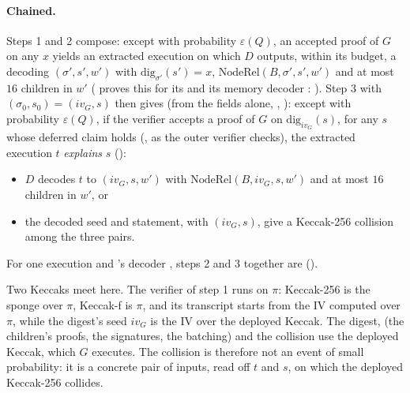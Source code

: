 \documentclass[11pt]{article}
\begin{document}
\paragraph{Chained.} Steps 1 and 2 compose: except with probability $\varepsilon(Q)$, an accepted
proof of $G$ on any $x$ yields an extracted execution on which $D$ outputs, within its budget, a
decoding $(\sigma', s', w')$ with $\mathrm{dig}_{\sigma'}(s') = x$,
$\mathrm{NodeRel}(B, \sigma', s', w')$ and at most $16$ children in $w'$ ( proves this for its
 and its memory decoder : ). Step 3
with $(\sigma_0, s_0) = (iv_G, s)$ then gives  (from the fields alone,
, ): except with probability $\varepsilon(Q)$, if
the verifier accepts a proof of $G$ on $\mathrm{dig}_{iv_G}(s)$, for any $s$ whose deferred claim
holds (, as the outer verifier checks), the extracted execution $t$
\emph{explains} $s$
():
\begin{itemize}
\item $D$ decodes $t$ to $(iv_G, s, w')$ with $\mathrm{NodeRel}(B, iv_G, s, w')$ and at most $16$
children in $w'$, or
\item the decoded seed and statement, with $(iv_G, s)$, give a Keccak-256 collision among the
three pairs.
\end{itemize}
For one execution and 's decoder , steps 2 and 3 together are
 ().

Two Keccaks meet here. The verifier of step 1 runs on $\pi$: Keccak-256 is the sponge over $\pi$,
Keccak-f is $\pi$, and its transcript starts from the IV computed over $\pi$, while the digest's
seed $iv_G$ is the IV over the deployed Keccak. The digest,  (the children's proofs, the signatures, the
batching) and the collision use the deployed Keccak, which $G$ executes. The collision is therefore
not an event of small probability: it is a concrete pair of inputs, read off $t$ and $s$, on which
the deployed Keccak-256 collides.
\end{document}

